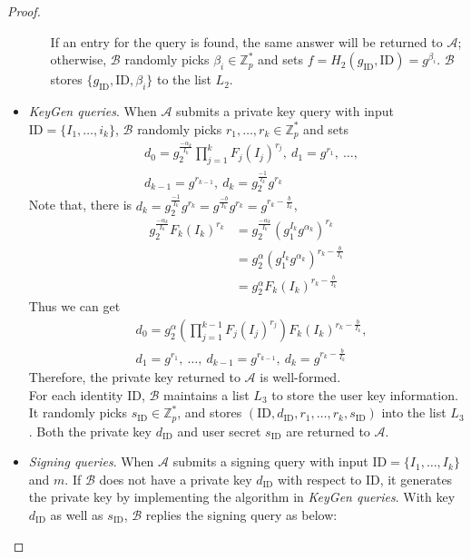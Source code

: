 \documentclass[times]{secauth}
\theoremstyle{definition}
\theoremstyle{remark}
\begin{document}
\begin{proof}
\begin{itemize}
\begin{itemize}
		If an entry for the query is found, the same answer will be returned to $\mathcal{A}$; otherwise, $\mathcal{B}$ randomly picks $\beta_i \in \mathbb{Z}_p^*$ and sets $f = H_2(g_\mathrm{ID}, \mathrm{ID}) = g^{\beta_i}$. 
		$\mathcal{B}$ stores $\{g_\mathrm{ID}, \mathrm{ID}, \beta_i\}$ to the list $L_2$.
	\end{itemize}
	\item \emph{KeyGen queries}. 
	When $\mathcal{A}$ submits a private key query with input $\mathrm{ID} = \{I_1, \ldots, i_k\}$, $\mathcal{B}$ randomly picks $r_1, \ldots, r_k \in \mathbb{Z}_p^*$ and sets
	\begin{align*}
	&d_0 = g_2^{\frac{-\alpha_k}{I_k}}\prod_{j=1}^{k}F_j(I_j)^{r_j}, ~d_1=g^{r_1}, ~\ldots, \\
	&d_{k-1}=g^{r_{k-1}}, ~d_k=g_2^{\frac{-1}{I_k}}g^{r_k}
	\end{align*}
	Note that, there is $d_k = g_2^{\frac{-1}{I_k}}g^{r_k} = g^{\frac{-b}{I_k}}g^{r_k} = g^{r_k-\frac{b}{I_k}}$,
	\begin{align*}
	g_2^{\frac{-\alpha_k}{I_k}}F_k(I_k)^{r_k} &= g_2^{\frac{-\alpha_k}{I_k}}(g_1^{I_k}g^{\alpha_k})^{r_k} \\
	&= g_2^\alpha(g_1^{I_k}g^{\alpha_k})^{r_k-\frac{b}{I_k}} \\
	&= g_2^\alpha F_k(I_k)^{r_k-\frac{b}{I_k}}
	\end{align*}
	Thus we can get 
	\begin{align*}
	&d_0 = g_2^\alpha \left(\prod_{j=1}^{k-1}F_j(I_j)^{r_j}\right)F_k(I_k)^{r_k-\frac{b}{I_k}}, \\
	&d_1=g^{r_1}, ~\ldots, ~d_{k-1}=g^{r_{k-1}}, ~d_k=g^{r_k-\frac{b}{I_k}}
	\end{align*}
	Therefore, the private key returned to $\mathcal{A}$ is well-formed.\\
	For each identity ID, $\mathcal{B}$ maintains a list $L_3$ to store the user key information.
	It randomly picks $s_\mathrm{ID} \in \mathbb{Z}_p^*$, and stores $(\mathrm{ID}, d_\mathrm{ID}, r_1, \ldots, r_k, s_\mathrm{ID})$ into the list $L_3$. 
	Both the private key $d_{\mathrm{ID}}$ and user secret $s_\mathrm{ID}$ are returned to $\mathcal{A}$.
	\item \emph{Signing queries}. 
	When $\mathcal{A}$ submits a signing query with input $\mathrm{ID} = \{I_1, \ldots, I_k\}$ and $m$.
	If $\mathcal{B}$ does not have a private key $d_{\mathrm{ID}}$ with respect to ID, it generates the private key by implementing the algorithm in \emph{KeyGen queries}. 
	With key $d_\mathrm{ID}$ as well as $s_\mathrm{ID}$, $\mathcal{B}$ replies the signing query as below:

\end{itemize}
\end{proof}
\end{document}
